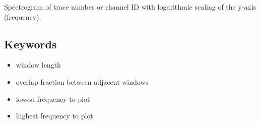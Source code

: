 \documentclass[letterpaper,10pt,english]{sphinxmanual}
\begin{document}
Spectrogram of trace number or channel ID  with logarithmic scaling of the
y-axis (frequency).


\subsection{Keywords}
\label{\detokenize{tf:keywords}}\begin{itemize}
\item {} 
 window length

\item {} 
 overlap fraction between adjacent windows

\item {} 
 lowest frequency to plot

\item {} 
 highest frequency to plot

\end{itemize}



\renewcommand{\indexname}{Index}
\printindex
\end{document}
